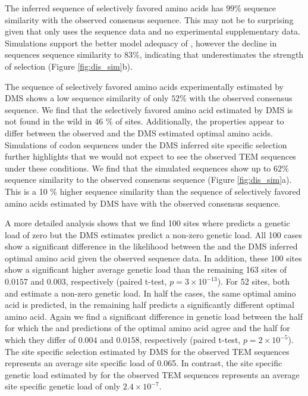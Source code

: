 The \selac inferred sequence of selectively favored amino acids has $99 \%$ sequence similarity with the observed consensus sequence.
This may not be to surprising given that \selac only uses the sequence data and no experimental supplementary data.
Simulations support the better model adequacy of \selac, however the decline in sequences sequence similarity to $83 \%$, indicating that \selac underestimates the strength of selection (Figure \ref{fig:dis_sim}b).

The sequence of selectively favored amino acids experimentally estimated by DMS shows a low sequence similarity of only $52 \%$ with the observed consensus sequence. 
We find that the selectively favored amino acid estimated by DMS is not found in the wild in 46 \% of sites.
Additionally, the \PC properties appear to differ between the observed and the DMS estimated optimal amino acids.
Simulations of codon sequences under the DMS inferred site specific selection further highlights that we would not expect to see the observed TEM sequences under these conditions.
We find that the simulated sequences show up to $62 \%$ sequence similarity to the observed consensus sequence (Figure \ref{fig:dis_sim}a).
This is a 10 \% higher sequence similarity than the sequence of selectively favored amino acids estimated by DMS have with the observed consensus sequence. 

A more detailed analysis shows that we find 100 sites where \selac predicts a genetic load of zero but the DMS estimates predict a non-zero genetic load.
All 100 cases show a significant difference in the likelihood between the \selac and the DMS inferred optimal amino acid given the observed sequence data.
In addition, these 100 sites show a significant higher average genetic load than the remaining 163 sites of $0.0157$ and $0.003$, respectively (paired t-test, $p = 3\times10^{-13}$).
For 52 sites, both \phydms and \selac estimate a non-zero genetic load.
In half the cases, the same optimal amino acid is predicted, in the remaining half \phydms predicts a significantly different optimal amino acid.
Again we find a significant difference in genetic load between the half for which the \selac and \phydms predictions of the optimal amino acid agree and the half for which they differ of $0.004$ and $0.0158$, respectively (paired t-test, $p = 2\times 10^{-5}$).
The site specific selection estimated by DMS for the observed TEM sequences represents an average site specific load of 0.065.
In contrast, the site specific genetic load estimated by \selac for the observed TEM sequences represents an average site specific genetic load of only $2.4\times 10^{-7}$.


